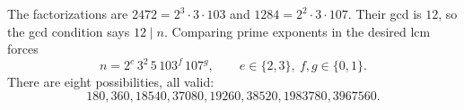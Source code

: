 The factorizations are $2472=2^3\cdot3\cdot103$ and $1284=2^2\cdot3\cdot107$. Their gcd is $12$, so the gcd condition says $12\mid n$. Comparing prime exponents in the desired lcm forces
\[
\boxed{n=2^e\,3^2\,5\,103^f\,107^g,\qquad e\in\{2,3\},\ f,g\in\{0,1\}}.
\]
There are eight possibilities, all valid:
\[
\boxed{180,360,18540,37080,19260,38520,1983780,3967560}.
\]
